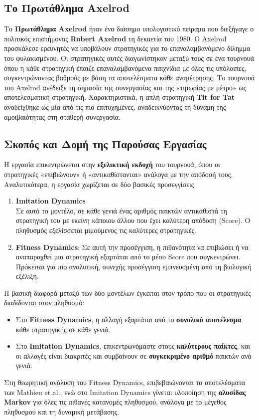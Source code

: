 \subsection*{Το Πρωτάθλημα Axelrod}
Το \textbf{Πρωτάθλημα Axelrod} ήταν ένα διάσημο υπολογιστικό πείραμα που διεξήγαγε ο πολιτικός επιστήμονας \textbf{Robert Axelrod} τη δεκαετία του 1980. Ο Axelrod προσκάλεσε ερευνητές να υποβάλουν στρατηγικές για το επαναλαμβανόμενο δίλημμα του φυλακισμένου. Οι στρατηγικές αυτές διαγωνίστηκαν μεταξύ τους σε ένα τουρνουά όπου η κάθε στρατηγική έπαιζε επαναλαμβανόμενα παιχνίδια με όλες τις υπόλοιπες, συγκεντρώνοντας βαθμούς με βάση τα αποτελέσματα κάθε αναμέτρησης.
Το τουρνουά του Axelrod ανέδειξε τη σημασία της συνεργασίας και της «τιμωρίας με μέτρο» ως αποτελεσματική στρατηγική. Χαρακτηριστικά, η απλή στρατηγική \textbf{Tit for Tat} αναδείχθηκε ως μία από τις πιο επιτυχημένες, αναδεικνύοντας τη δύναμη της αμοιβαιότητας στη σταθερή συνεργασία.
\clearpage
\subsection*{Σκοπός και Δομή της Παρούσας Εργασίας
}Η εργασία επικεντρώνεται στην \textbf{εξελικτική εκδοχή} του τουρνουά, όπου οι στρατηγικές «επιβιώνουν» ή «αντικαθίστανται» ανάλογα με την απόδοσή τους. Αναλυτικότερα, η εργασία χωρίζεται σε δύο βασικές προσεγγίσεις
\begin{enumerate}
	\item \textbf{Imitation Dynamics}\\ Σε αυτό το μοντέλο, σε κάθε γενιά ένας αριθμός παικτών αντικαθιστά τη στρατηγική του με εκείνη κάποιου άλλου που έχει καλύτερη απόδοση (Score). Ο πληθυσμός εξελίσσεται μιμούμενος τις καλύτερες στρατηγικές.
	\item 	\textbf{Fitness Dynamics}: Σε αυτή την προσέγγιση, η πιθανότητα να επιβιώσει ή να αναπαραχθεί μια στρατηγική εξαρτάται από το μέσο Score που συγκεντρώνει. Πρόκειται για πιο αναλυτική, συνεχής προσέγγιση εμπνευσμένη από τη βιολογική εξέλιξη.
	
\end{enumerate}
Η βασική διαφορά μεταξύ των δύο μοντέλων έγκειται στον τρόπο που οι στρατηγικές διαδίδονται στον πληθυσμό:
\begin{itemize}
	\item Στο \textbf{Fitness Dynamics}, η αλλαγή εξαρτάται από το \textbf{συνολικό αποτέλεσμα} κάθε στρατηγικής σε κάθε γενιά.
	\item Στο \textbf{Imitation Dynamics}, επικεντρωνόμαστε στους \textbf{καλύτερους παίκτες}, και οι αλλαγές είναι διακριτές και συμβαίνουν σε \textbf{συγκεκριμένο αριθμό} παικτών ανά γενιά.
	
\end{itemize}Στη θεωρητική ανάλυση του Fitness Dynamics, επιβεβαιώνονται τα αποτελέσματα των \cite{paper} Mathieu et al., ενώ στο Imitation Dynamics γίνεται υλοποίηση της \textbf{αλυσίδας Markov} για όλες τις πιθανές κατανομές πληθυσμού, ανάλογα με το μέγεθος πληθυσμού και τη δυναμική μετάβασης.
